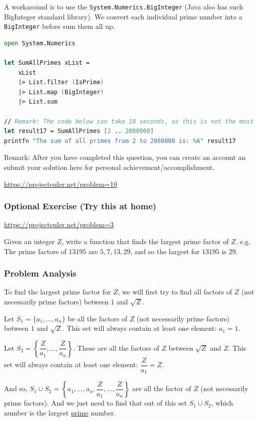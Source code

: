 \documentclass[12pt]{article}
\begin{document}
A workaround is to use the \texttt{System.Numerics.BigInteger} (Java also has such BigInteger standard library). We convert each individual prime number into a \texttt{BigInteger} before sum them all up.

\begin{lstlisting}[language=FSharp]
open System.Numerics

let SumAllPrimes xList =
    xList
    |> List.filter (IsPrime)
    |> List.map (BigInteger)
    |> List.sum

// Remark: The code below can take 10 seconds, as this is not the most optimal algorithm.
let result17 = SumAllPrimes [2 .. 2000000]
printfn "The sum of all primes from 2 to 2000000 is: %A" result17
\end{lstlisting}
Remark: After you have completed this question, you can create an account an submit your solution here for personal achievement/accomplishment.

\url{https://projecteuler.net/problem=10}

\pagebreak

\subsubsection*{Optional Exercise (Try this at home)}
\url{https://projecteuler.net/problem=3}

Given an integer $Z$, write a function that finds the largest prime factor of $Z$. e.g. The prime factors of $13195$ are $5, 7, 13, 29$, and so the largest for $13195$ is $29$.

\subsubsection*{Problem Analysis}
To find the largest prime factor for $Z$, we will first try to find all factors of $Z$ (not necessarily prime factors) between $1$ and $\sqrt{Z}$. 

Let $S_1 = \{a_1, \ldots, a_n\}$ be all the factors of $Z$ (not necessarily prime factors) between $1$ and $\sqrt{Z}$. This set will always contain at least one element: $a_1 = 1$.

Let $S_2 = \left\{\dfrac{Z}{a_1},\ldots, \dfrac{Z}{a_n}\right\}$. These are all the factors of $Z$ between $\sqrt{Z}$ and $Z$. This set will always contain at least one element: $\dfrac{Z}{a_1} = Z$.

And so, $S_1 \cup S_2 =  \left\{a_1, \ldots, a_n, \dfrac{Z}{a_1},\ldots, \dfrac{Z}{a_n}\right\}$ are all the factor of $Z$ (not necessarily prime factors). And we just need to find that out of this set $S_1 \cup S_2$, which number is the largest \underline{prime} number.
\end{document}
